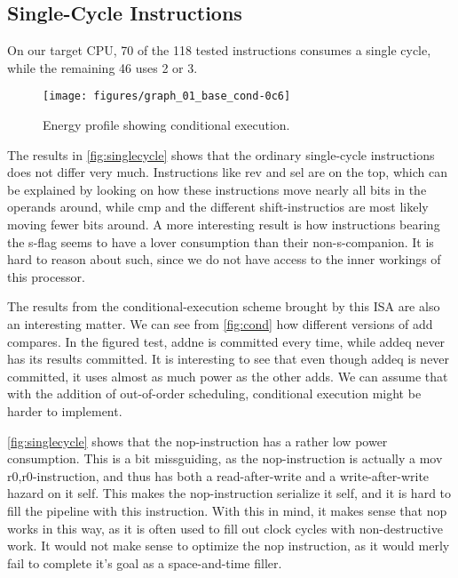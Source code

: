 \subsection{Single-Cycle Instructions}
On our target CPU, 70 of the 118 tested instructions consumes a single cycle,
while the remaining 46 uses 2 or 3.

\begin{figure}
    \centering
    \texttt{[image: figures/graph\_01\_base\_cond-0c6]}
    \caption{Energy profile showing conditional execution.}
    \label{fig:cond}
\end{figure}

The results in \autoref{fig:singlecycle} shows that the ordinary single-cycle instructions
does not differ very much. Instructions like {\ttfamily rev} and {\ttfamily sel} are on the
top, which can be explained by looking on how these instructions move nearly all bits in
the operands around, while {\ttfamily cmp} and the different shift-instructios are most likely
moving fewer bits around. A more interesting result is how instructions bearing the {\ttfamily s}-flag
seems to have a lover consumption than their non-{\ttfamily s}-companion. It is hard to reason about
such, since we do not have access to the inner workings of this processor.

The results from the conditional-execution scheme brought by this ISA are also an interesting matter. We
can see from \autoref{fig:cond} how different versions of {\ttfamily add} compares. In the figured test,
{\ttfamily addne} is committed every time, while {\ttfamily addeq} never has its results committed. It is
interesting to see that even though {\ttfamily addeq} is never committed, it uses almost as much power as
the other {\ttfamily add}s. We can assume that with the addition of out-of-order scheduling, conditional
execution might be harder to implement.

\autoref{fig:singlecycle} shows that the {\ttfamily nop}-instruction has a rather low power consumption. This
is a bit missguiding, as the {\ttfamily nop}-instruction is actually a {\ttfamily mov r0,r0}-instruction, and thus
has both a read-after-write and a write-after-write hazard on it self. This makes the {\ttfamily nop}-instruction
serialize it self, and it is hard to fill the pipeline with this instruction. With this in mind, it makes sense
that {\ttfamily nop} works in this way, as it is often used to fill out clock cycles with non-destructive work. It
would not make sense to optimize the {\ttfamily nop} instruction, as it would merly fail to complete it's goal as
a space-and-time filler.

